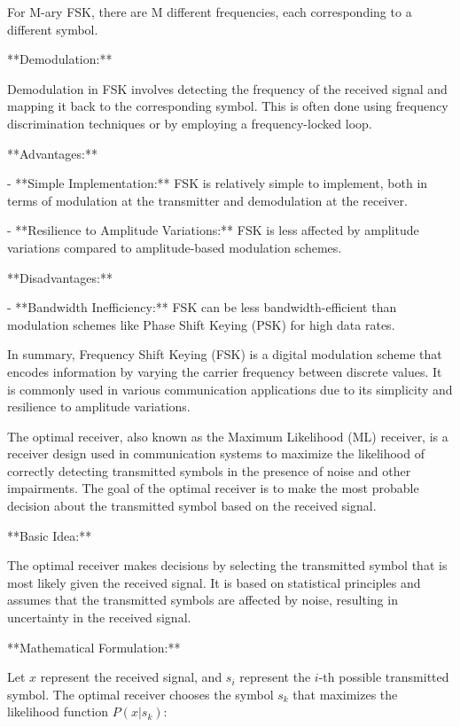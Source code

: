\documentclass[../../../../DMCC-My-Notebook]{subfiles}
\begin{document}
	For M-ary FSK, there are M different frequencies, each corresponding to a different symbol.
	
	**Demodulation:**
	
	Demodulation in FSK involves detecting the frequency of the received signal and mapping it back to the corresponding symbol. This is often done using frequency discrimination techniques or by employing a frequency-locked loop.
	
	**Advantages:**
	
	- **Simple Implementation:** FSK is relatively simple to implement, both in terms of modulation at the transmitter and demodulation at the receiver.
	
	- **Resilience to Amplitude Variations:** FSK is less affected by amplitude variations compared to amplitude-based modulation schemes.
	
	**Disadvantages:**
	
	- **Bandwidth Inefficiency:** FSK can be less bandwidth-efficient than modulation schemes like Phase Shift Keying (PSK) for high data rates.
	
	In summary, Frequency Shift Keying (FSK) is a digital modulation scheme that encodes information by varying the carrier frequency between discrete values. It is commonly used in various communication applications due to its simplicity and resilience to amplitude variations.
	
	
	
	
	
	
	
	The optimal receiver, also known as the Maximum Likelihood (ML) receiver, is a receiver design used in communication systems to maximize the likelihood of correctly detecting transmitted symbols in the presence of noise and other impairments. The goal of the optimal receiver is to make the most probable decision about the transmitted symbol based on the received signal.
	
	**Basic Idea:**
	
	The optimal receiver makes decisions by selecting the transmitted symbol that is most likely given the received signal. It is based on statistical principles and assumes that the transmitted symbols are affected by noise, resulting in uncertainty in the received signal.
	
	**Mathematical Formulation:**
	
	Let \(x\) represent the received signal, and \(s_i\) represent the \(i\)-th possible transmitted symbol. The optimal receiver chooses the symbol \(s_k\) that maximizes the likelihood function \(P(x|s_k)\):
	
\end{document}
